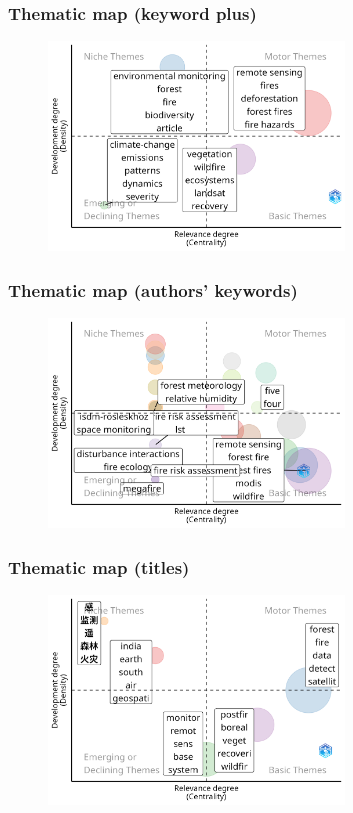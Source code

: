 \documentclass[aspectratio=169]{beamer}
\begin{document}
\begin{frame}
	\frametitle{Thematic map (keyword plus)}
	\begin{figure}
		\centering
		\includegraphics[width=0.7\textwidth]{figures/thematic_map_keyword_plus.png}
	\end{figure}
\end{frame}

\begin{frame}
	\frametitle{Thematic map (authors' keywords)}
	\begin{figure}
		\centering
		\includegraphics[width=0.7\textwidth]{figures/thematic_map_keyword_authors.png}
	\end{figure}
\end{frame}

\begin{frame}
	\frametitle{Thematic map (titles)}
	\begin{figure}
		\centering
		\includegraphics[width=0.7\textwidth]{figures/thematic_map_titles.png}
	\end{figure}
\end{frame}
\end{document}
